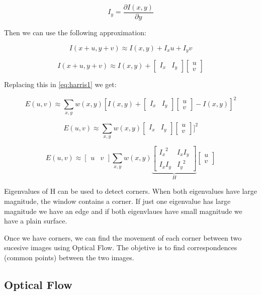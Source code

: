 $$
I_y = \frac{\partial{I(x,y)}}{\partial{y}}
$$

Then we can use the following approximation:

$$
I(x+u,y +v) \approx I(x,y) + I_xu + I_yv
$$

$$
I(x+u,y +v) \approx I(x,y) + \begin{bmatrix} I_x & I_y \end{bmatrix} \begin{bmatrix} u \\ v \end{bmatrix}
$$ 

Replacing this in \ref{eq:harris1} we get:

$$
E(u,v) \approx \sum\limits_{x,y} { w(x,y) [I(x,y)  + \begin{bmatrix} I_x & I_y \end{bmatrix} \begin{bmatrix} u \\ v \end{bmatrix} - I(x,y)]^2  }
$$

$$
E(u,v) \approx \sum\limits_{x,y} { w(x,y) \begin{bmatrix} I_x & I_y \end{bmatrix} \begin{bmatrix} u \\ v \end{bmatrix} ]^2  }
$$

$$
E(u,v) \approx \begin{bmatrix} u & v \end{bmatrix} \sum\limits_{x,y} w(x,y) \underbrace{\begin{bmatrix} {I_x}^2 & I_x I_y \\ I_x I_y & {I_y}^2 \end{bmatrix}}_{H} \begin{bmatrix} u \\ v \end{bmatrix}
$$


Eigenvalues of H can be used to detect corners. When both eigenvalues have large magnitude, the window contains a corner. If just one 
eigenvalue has large magnitude we have an edge and if both eigenvlaues have small magnitude we have a plain surface.

Once we have corners, we can find the movement of each corner between two sucesive images using Optical Flow. The objetive 
is to find correspondences (common points) between the two images.

\subsection{Optical Flow}

